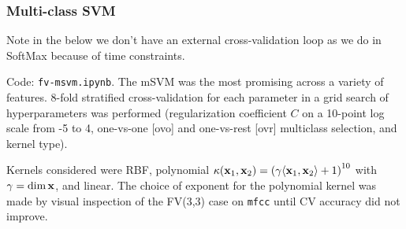 \documentclass{article}
\begin{document}
\subsubsection{Multi-class SVM}

Note in the below we don't have an external cross-validation loop as we do in SoftMax because of time constraints.

Code: \texttt{fv-msvm.ipynb}. The mSVM was the most promising across a variety of features. 8-fold stratified cross-validation for each parameter in a grid search of hyperparameters was performed (regularization coefficient $C$ on a 10-point log scale from -5 to 4, one-vs-one [ovo] and one-vs-rest [ovr] multiclass selection, and kernel type).

Kernels considered were RBF, polynomial $\kappa(\textbf{x}_1, \textbf{x}_2)=\left({\gamma\langle \textbf{x}_1,\textbf{x}_2 \rangle+1}\right)^{10}$ with $\gamma=\dim \textbf{x}$, and linear. The choice of exponent for the polynomial kernel was made by visual inspection of the FV(3,3) case on \texttt{mfcc} until CV accuracy did not improve.
\end{document}
